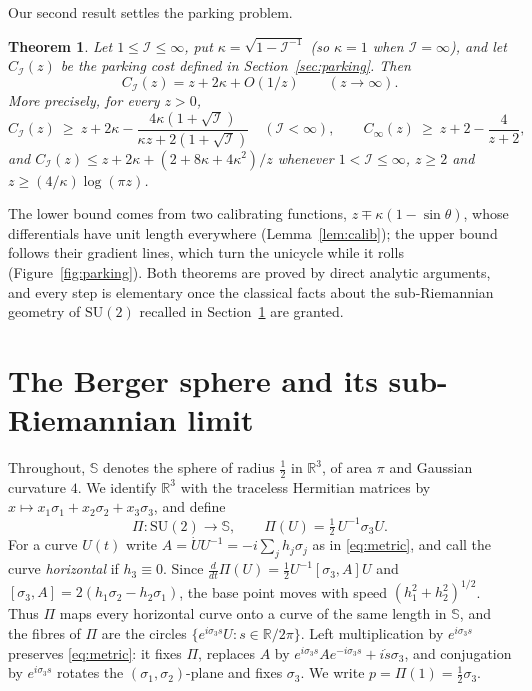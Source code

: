 \documentclass[11pt]{amsart}
\newtheorem{mainthm}{Theorem}
\theoremstyle{definition}
\newcommand{\RR}{\mathbb{R}}
\newcommand{\I}{\mathcal{I}}
\newcommand{\SU}{\mathrm{SU}(2)}
\newcommand{\Sp}{\mathbb{S}}
\begin{document}
Our second result settles the parking problem.

\begin{mainthm}\label{thm:B}
Let $1\le\I\le\infty$, put $\kappa=\sqrt{1-\I^{-1}}$ (so $\kappa=1$ when $\I=\infty$), and let $C_\I(z)$ be the parking cost defined in Section~\ref{sec:parking}. Then
\[
C_\I(z)=z+2\kappa+O(1/z)\qquad(z\to\infty).
\]
More precisely, for every $z>0$,
\[
C_\I(z)\ \ge\ z+2\kappa-\frac{4\kappa(1+\sqrt{\I})}{\kappa z+2(1+\sqrt{\I})}\quad(\I<\infty),\qquad C_\infty(z)\ \ge\ z+2-\frac{4}{z+2},
\]
and $C_\I(z)\le z+2\kappa+(2+8\kappa+4\kappa^2)/z$ whenever $1<\I\le\infty$, $z\ge2$ and $z\ge(4/\kappa)\log(\pi z)$.
\end{mainthm}

The lower bound comes from two calibrating functions, $z\mp\kappa(1-\sin\theta)$, whose differentials have unit length everywhere (Lemma~\ref{lem:calib}); the upper bound follows their gradient lines, which turn the unicycle while it rolls (Figure~\ref{fig:parking}). Both theorems are proved by direct analytic arguments, and every step is elementary once the classical facts about the sub-Riemannian geometry of $\SU$ recalled in Section~\ref{sec:berger} are granted.

\section{The Berger sphere and its sub-Riemannian limit}\label{sec:berger}

Throughout, $\Sp$ denotes the sphere of radius $\tfrac12$ in $\RR^3$, of area $\pi$ and Gaussian curvature $4$. We identify $\RR^3$ with the traceless Hermitian matrices by $x\mapsto x_1\sigma_1+x_2\sigma_2+x_3\sigma_3$, and define
\[
\Pi:\SU\to\Sp,\qquad \Pi(U)=\tfrac12\,U^{-1}\sigma_3U .
\]
For a curve $U(t)$ write $A=\dot UU^{-1}=-i\sum_jh_j\sigma_j$ as in \eqref{eq:metric}, and call the curve \emph{horizontal} if $h_3\equiv0$. Since $\tfrac{d}{dt}\Pi(U)=\tfrac12U^{-1}[\sigma_3,A]U$ and $[\sigma_3,A]=2(h_1\sigma_2-h_2\sigma_1)$, the base point moves with speed $(h_1^2+h_2^2)^{1/2}$. Thus $\Pi$ maps every horizontal curve onto a curve of the same length in $\Sp$, and the fibres of $\Pi$ are the circles $\{e^{i\sigma_3 s}U:s\in\RR/2\pi\}$. Left multiplication by $e^{i\sigma_3 s}$ preserves \eqref{eq:metric}: it fixes $\Pi$, replaces $A$ by $e^{i\sigma_3s}Ae^{-i\sigma_3s}+i\dot s\sigma_3$, and conjugation by $e^{i\sigma_3s}$ rotates the $(\sigma_1,\sigma_2)$-plane and fixes $\sigma_3$. We write $p=\Pi(1)=\tfrac12\sigma_3$.
\end{document}
